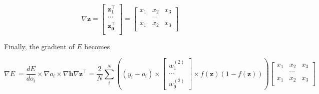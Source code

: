 \documentclass[11pt]{article}%
\begin{document}
	$$
	\nabla \mathbf{z} = 
	\begin{bmatrix}
	\mathbf{z^\intercal_1} \\
	\cdots \\
	\mathbf{z^\intercal_9} \\
	\end{bmatrix}
	=  \begin{bmatrix}
	x_1 & x_2 & x_3 \\
	 & \cdots & \\
	x_1 & x_2 & x_3 \\
	\end{bmatrix}
	$$


Finally, the gradient of $E$ becomes

	$$
	\nabla E \ = \frac{dE}{do_i} \times \nabla o_i \times \nabla \mathbf{h} \nabla \mathbf{z}^\intercal = \frac{2}{N}  \sum^N_{i}  \left( (y_i - o_i) \times 
	\begin{bmatrix}
	w^{(2)}_1 \\
	\cdots \\
	w^{(2)}_9
	\end{bmatrix} \times 
	f(\mathbf{z}) (1 - f(\mathbf{z})) \right)
	\begin{bmatrix}
	x_1 & x_2 & x_3 \\
	 & \cdots & \\
	x_1 & x_2 & x_3 \\
	\end{bmatrix}	
	$$
\end{document}

